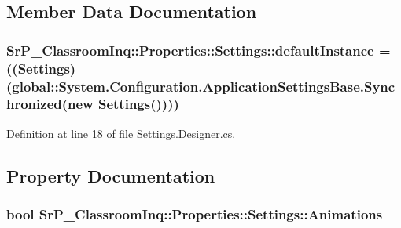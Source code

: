 \subsection{\-Member \-Data \-Documentation}
\hypertarget{class_sr_p___classroom_inq_1_1_properties_1_1_settings_a0a71ce7c79440c1532000746426ccf1f}{
\subsubsection[{default\-Instance}]{ {\bf \-Sr\-P\-\_\-\-Classroom\-Inq\-::\-Properties\-::\-Settings\-::default\-Instance} = (({\bf \-Settings})(global\-::\-System.\-Configuration.\-Application\-Settings\-Base.\-Synchronized(new {\bf \-Settings}())))}}
\label{class_sr_p___classroom_inq_1_1_properties_1_1_settings_a0a71ce7c79440c1532000746426ccf1f}


\-Definition at line \hyperlink{_settings_8_designer_8cs_source_l00018}{18} of file \hyperlink{_settings_8_designer_8cs_source}{\-Settings.\-Designer.\-cs}.



\subsection{\-Property \-Documentation}
\hypertarget{class_sr_p___classroom_inq_1_1_properties_1_1_settings_ab4e4d47d4289ea293aa6c3176ef7ba39}{
\subsubsection[{\-Animations}]{\setlength{\rightskip}{0pt plus 5cm}bool \-Sr\-P\-\_\-\-Classroom\-Inq\-::\-Properties\-::\-Settings\-::\-Animations}}
\label{class_sr_p___classroom_inq_1_1_properties_1_1_settings_ab4e4d47d4289ea293aa6c3176ef7ba39}


